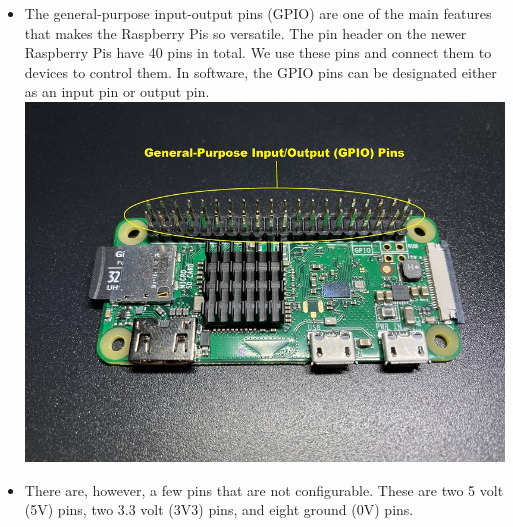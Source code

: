 \documentclass{article}\usepackage[]{graphicx}\usepackage[]{color}
\begin{document}
\begin{itemize}

\item The general-purpose input-output pins (GPIO) are one of the main features that makes the Raspberry Pis so versatile. The pin header on the newer Raspberry Pis have 40 pins in total. We use these pins and connect them to devices to control them. In software, the GPIO pins can be designated either as an input pin or output pin.
\newline
\newline
\includegraphics[width=1.00\textwidth]{pinheader}
\item There are, however, a few pins that are not configurable. These are two 5 volt (5V) pins, two 3.3 volt (3V3) pins, and eight ground (0V) pins.
\newline
\newline
\begin{center}

\end{center}
\end{itemize}
\end{document}
